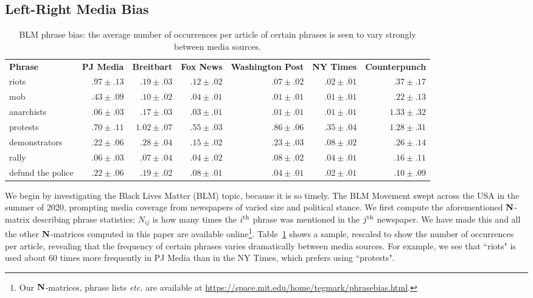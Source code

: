 \documentclass[10pt,letterpaper]{article}
\def\etc{{\frenchspacing\it etc.}}
\def\N{{\bf N}}
\newlength\savedwidth
\newcommand\thickhline{\noalign{\global\savedwidth\arrayrulewidth\global\arrayrulewidth 2pt}%
\hline
\noalign{\global\arrayrulewidth\savedwidth}}
\begin{document}
\subsection*{Left-Right Media Bias}

\begin{table}[t]
\begin{adjustwidth}{-2.25in}{0in} %
\centering
\caption{BLM phrase bias: the average number of occurrences per article of certain phrases is seen to vary strongly between media sources.}
\begin{tabular}{|l|r|r|r|r|r|r|} \hline
\textbf{Phrase} & \textbf{PJ Media} & \textbf{Breitbart} & \textbf{Fox News} & \textbf{Washington Post} & \textbf{NY Times} & \textbf{Counterpunch}\\ 
 \thickhline
{riots} & $.97 \pm .13$ & $.19 \pm .03$ & $.12 \pm .02$ & $.07 \pm .02$ & $.02 \pm .01$ & $.37 \pm .17$ \\ \hline
{mob} & $.43 \pm .09$ & $.10 \pm .02$ & $.04 \pm .01$ & $.01 \pm .01$ & $.01 \pm .01$ & $.22 \pm .13$ \\ \hline
{anarchists} & $.06 \pm .03$ & $.17 \pm .03$ & $.03\pm .01$ & $.01 \pm .01$ & $.01 \pm .01$ & $1.33 \pm .32$ \\ \hline
{protests}& $.70 \pm .11$ & $1.02 \pm .07$ & $.55 \pm .03$ & $.86 \pm .06$ & $.35 \pm .04$ & $1.28 \pm .31$ \\ \hline
{demonstrators}& $.22 \pm .06$ & $.28 \pm .04$ & $.15 \pm .02$ & $.23 \pm .03$ & $.08 \pm .02$ & $.26 \pm .14$ \\ \hline
{rally}& $.06 \pm .03$ & $.07  \pm .04$ & $.04 \pm .02$ & $.08 \pm .02$ & $.04 \pm .01$ & $.16 \pm .11$ \\ \hline
{defund the police}& $.22 \pm .06$ & $.19 \pm .02$ & $.08 \pm .01$ & $.04 \pm .01$ & $.02 \pm .01$ & $.10 \pm .09$ \\ \hline
\end{tabular}
\label{BLM_counts}
\end{adjustwidth}
\end{table}


We begin by investigating the Black Lives Matter (BLM) topic, because it is so timely. The BLM Movement swept across the USA in the summer of 2020, prompting media coverage from newspapers of varied size and political stance. We first compute the aforementioned $\N$-matrix describing phrase statistics; $N_{ij}$ is how many times the $i^{\rm th}$ phrase was mentioned in the $j^{\rm th}$ newspaper. We have made this and all the other $\N$-matrices computed in this paper are available online\footnote{Our $\N$-matrices, phrase lists {\etc} are available at \url{https://space.mit.edu/home/tegmark/phrasebias.html}.}. Table~\ref{BLM_counts} shows a sample, 
rescaled to show the number of occurrences per article,
revealing that the frequency of certain phrases varies dramatically between media sources. 
For example, we see that ``riots" is used about 60 times more frequently in PJ Media than in the NY Times, which prefers using ``protests". 
\end{document}
